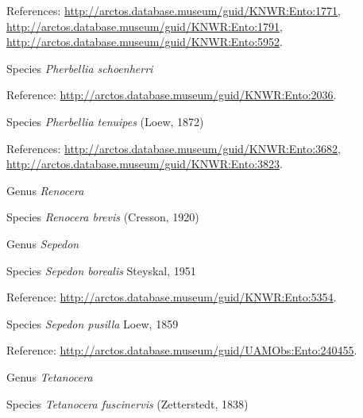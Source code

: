 \documentclass[9pt, article]{memoir}
\begin{document}
\begin{multicols}{2}
\vspace{6pt}References: 
\url{http://arctos.database.museum/guid/KNWR:Ento:1771}, 
\url{http://arctos.database.museum/guid/KNWR:Ento:1791}, 
\url{http://arctos.database.museum/guid/KNWR:Ento:5952}.

\vspace{6pt}\noindent\hspace{36pt}Species \textit{Pherbellia schoenherri}


\vspace{6pt}Reference: 
\url{http://arctos.database.museum/guid/KNWR:Ento:2036}.

\vspace{6pt}\noindent\hspace{36pt}Species \textit{Pherbellia tenuipes} (Loew, 1872)


\vspace{6pt}References: 
\url{http://arctos.database.museum/guid/KNWR:Ento:3682}, 
\url{http://arctos.database.museum/guid/KNWR:Ento:3823}.

\vspace{6pt}\noindent\hspace{30pt}Genus \textit{Renocera}


\vspace{6pt}\noindent\hspace{36pt}Species \textit{Renocera brevis} (Cresson, 1920)


\vspace{6pt}\noindent\hspace{30pt}Genus \textit{Sepedon}


\vspace{6pt}\noindent\hspace{36pt}Species \textit{Sepedon borealis} Steyskal, 1951


\vspace{6pt}Reference: 
\url{http://arctos.database.museum/guid/KNWR:Ento:5354}.

\vspace{6pt}\noindent\hspace{36pt}Species \textit{Sepedon pusilla} Loew, 1859


\vspace{6pt}Reference: 
\url{http://arctos.database.museum/guid/UAMObs:Ento:240455}.

\vspace{6pt}\noindent\hspace{30pt}Genus \textit{Tetanocera}


\vspace{6pt}\noindent\hspace{36pt}Species \textit{Tetanocera fuscinervis} (Zetterstedt, 1838)



\end{multicols}
\end{document}

